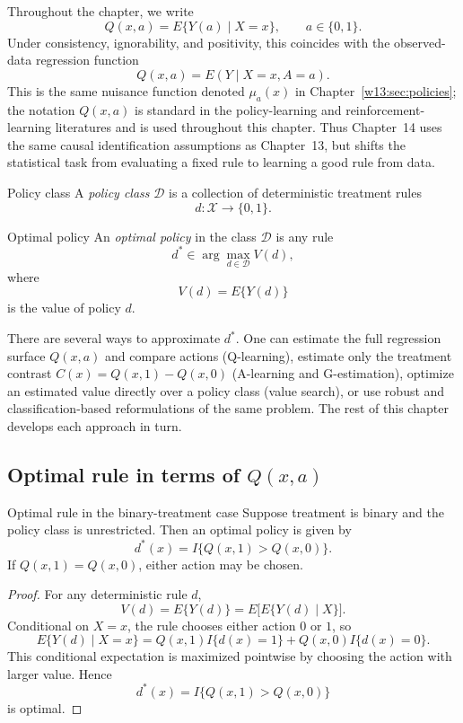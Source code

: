 \documentclass[master.tex]{subfiles}
\begin{document}
Throughout the chapter, we write
\[
Q(x,a)=E\{Y(a)\mid X=x\}, \qquad a\in\{0,1\}.
\]
Under consistency, ignorability, and positivity, this coincides with the observed-data regression function
\[
Q(x,a)=E(Y\mid X=x,A=a).
\]
This is the same nuisance function denoted $\mu_a(x)$ in Chapter~\ref{w13:sec:policies}; the notation $Q(x,a)$ is standard in the policy-learning and reinforcement-learning literatures and is used throughout this chapter. Thus Chapter~14 uses the same causal identification assumptions as Chapter~13, but shifts the statistical task from evaluating a fixed rule to learning a good rule from data.

\begin{defn}{Policy class}
\label{w14:defn:policy-class}
A \emph{policy class} \(\mathcal D\) is a collection of deterministic treatment rules
\[
d:\mathcal X\to\{0,1\}.
\]
\end{defn}

\begin{defn}{Optimal policy}
\label{w14:defn:optimal-policy}
An \emph{optimal policy} in the class \(\mathcal D\) is any rule
\[
d^\ast \in \arg\max_{d\in\mathcal D} V(d),
\]
where
\[
V(d)=E\{Y(d)\}
\]
is the value of policy \(d\).
\end{defn}

There are several ways to approximate \(d^\ast\). One can estimate the full regression surface \(Q(x,a)\) and compare actions (Q-learning), estimate only the treatment contrast \(C(x)=Q(x,1)-Q(x,0)\) (A-learning and G-estimation), optimize an estimated value directly over a policy class (value search), or use robust and classification-based reformulations of the same problem. The rest of this chapter develops each approach in turn.

\subsection{Optimal rule in terms of \(Q(x,a)\)}

\begin{thm}{Optimal rule in the binary-treatment case}
\label{w14:thm:opt-rule}
Suppose treatment is binary and the policy class is unrestricted. Then an optimal policy is given by
\[
d^\ast(x)=I\{Q(x,1)>Q(x,0)\}.
\]
If \(Q(x,1)=Q(x,0)\), either action may be chosen.
\end{thm}

\begin{proof}
For any deterministic rule \(d\),
\[
V(d)=E\{Y(d)\}=E\big[E\{Y(d)\mid X\}\big].
\]
Conditional on \(X=x\), the rule chooses either action \(0\) or \(1\), so
\[
E\{Y(d)\mid X=x\}=Q(x,1)I\{d(x)=1\}+Q(x,0)I\{d(x)=0\}.
\]
This conditional expectation is maximized pointwise by choosing the action with larger value. Hence
\[
d^\ast(x)=I\{Q(x,1)>Q(x,0)\}
\]
is optimal.
\end{proof}
\end{document}

